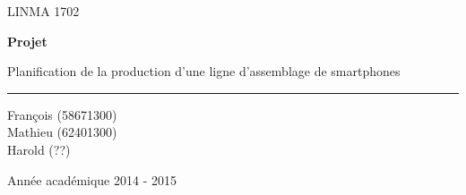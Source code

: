 \documentclass[10pt, a4, oneside, headings=normal]{scrreprt}
\begin{document}
\begin{titlepage}

\selectfont
\begin{center}
LINMA 1702
\end{center}
\begin{center}\huge\bfseries
Projet
\end{center}

\begin{center}
Planification de la production d'une ligne d'assemblage de smartphones
\end{center}
\hrule

\begin{center}\large
\end{center}
\begin{center}\large
\end{center}
\begin{center}\large
\end{center}
\begin{center}\large
\end{center}
\begin{center}\large
\end{center}
\begin{center}\large
\end{center}
\begin{center}\large
\end{center}



\begin{center}\large
\end{center}

\begin{center}\large
 François  (58671300) \\  Mathieu  (62401300) \\Harold {} (??)
\end{center}

\begin{center}\large
\end{center}

\begin{center}
Ann\'ee acad\'emique 2014 - 2015
\end{center}
\end{titlepage}
\end{document}
